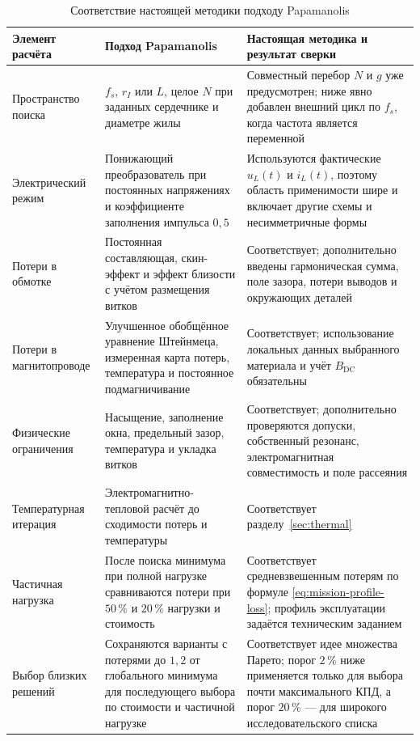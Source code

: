 \documentclass[14pt,a4paper]{extarticle}
\begin{document}
\begin{table}[H]
\caption{Соответствие настоящей методики подходу Papamanolis}
\label{tab:papamanolis-compliance}
\centering
\scriptsize
\begin{tabularx}{\textwidth}{
>{\raggedright\arraybackslash}p{31mm}
>{\raggedright\arraybackslash}p{48mm}
>{\raggedright\arraybackslash}X}
\toprule
Элемент расчёта & Подход Papamanolis & Настоящая методика и результат сверки \\
\midrule
Пространство поиска &
$f_s$, $r_I$ или $L$, целое $N$ при заданных сердечнике и диаметре жилы &
Совместный перебор $N$ и $g$ уже предусмотрен; ниже явно добавлен внешний
цикл по $f_s$, когда частота является переменной \\
Электрический режим &
Понижающий преобразователь при постоянных напряжениях и коэффициенте
заполнения импульса $0{,}5$ &
Используются фактические $u_L(t)$ и $i_L(t)$, поэтому область применимости
шире и включает другие схемы и несимметричные формы \\
Потери в обмотке &
Постоянная составляющая, скин-эффект и эффект близости с учётом размещения
витков &
Соответствует; дополнительно введены гармоническая сумма, поле зазора,
потери выводов и окружающих деталей \\
Потери в магнитопроводе &
Улучшенное обобщённое уравнение Штейнмеца, измеренная карта потерь,
температура и постоянное подмагничивание &
Соответствует; использование локальных данных выбранного материала и
учёт $B_{\text{DC}}$ обязательны \\
Физические ограничения &
Насыщение, заполнение окна, предельный зазор, температура и укладка витков &
Соответствует; дополнительно проверяются допуски, собственный резонанс,
электромагнитная совместимость и поле рассеяния \\
Температурная итерация &
Электромагнитно-тепловой расчёт до сходимости потерь и температуры &
Соответствует разделу~\ref{sec:thermal} \\
Частичная нагрузка &
После поиска минимума при полной нагрузке сравниваются потери при
$50\,\%$ и $20\,\%$ нагрузки и стоимость &
Соответствует средневзвешенным потерям по формуле
\eqref{eq:mission-profile-loss}; профиль эксплуатации задаётся техническим
заданием \\
Выбор близких решений &
Сохраняются варианты с потерями до $1{,}2$ от глобального минимума для
последующего выбора по стоимости и частичной нагрузке &
Соответствует идее множества Парето; порог $2\,\%$ ниже применяется только
для выбора почти максимального КПД, а порог $20\,\%$ --- для широкого
исследовательского списка \\
\bottomrule
\end{tabularx}
\end{table}
\end{document}
